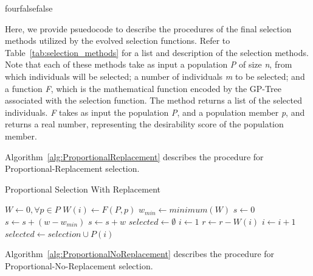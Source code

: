 \documentclass[times,12pt,titlepage]{mstogs}
\begin{document}

\begin{ThesisAppendix}{four}{false}{false}


\label{apx:SelectionPsuedocode}

Here, we provide psuedocode to describe the procedures of the final selection methods utilized by the evolved selection functions. Refer to Table~\ref{tab:selection_methods} for a list and description of the selection methods. Note that each of these methods take as input a population \textit{P} of size \textit{n}, from which individuals will be selected; a number of individuals \textit{m} to be selected; and a function \textit{F}, which is the mathematical function encoded by the GP-Tree associated with the selection function. The method returns a list of the selected individuals. \textit{F} takes as input the population \textit{P}, and a population member \textit{p}, and returns a real number, representing the desirability score of the population member.

Algorithm~\ref{alg:ProportionalReplacement} describes the procedure for Proportional-Replacement selection.

\begin{algorithm}
\caption{Proportional Selection With Replacement}
\label{alg:ProportionalReplacement}
\begin{algorithmic}[1]
 \label{proc:ProportionalReplacement}
	\State $W \leftarrow 0,\forall p \in P$
		\State $W(i) \leftarrow F(P,p)$
	\EndFor
	\State $w_{min} \leftarrow minimum(W)$	
	\State $s \leftarrow 0$
			\State $s \leftarrow s + (w - w_{min} )$			
		\Else
			\State $s \leftarrow s + w$		
		\EndIf	
	\EndFor
	\State $selected \leftarrow \emptyset$
		\State $i \leftarrow 1$
			\State $r \leftarrow r - W(i)$
			\State $i \leftarrow i + 1$
		\EndWhile	
		\State $selected \leftarrow selection \cup P(i)$
	\EndFor
\EndProcedure
\end{algorithmic}
\end{algorithm}

Algorithm~\ref{alg:ProportionalNoReplacement} describes the procedure for Proportional-No-Replacement selection.


\end{ThesisAppendix}
\end{document}
